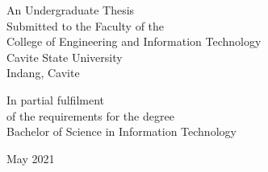 
\begin{singlespace}
	\begin{titlepage}
		\begin{center}
			\textbf{\thesistitle{}}

			\vfill
			\center
			An Undergraduate Thesis\\
			Submitted to the Faculty of the\\
			College of Engineering and Information Technology\\
			Cavite State University\\
			Indang, Cavite

			\vfill
			\center
			In partial fulfilment\\
			of the requirements for the degree\\
			Bachelor of Science in Information Technology

			\vfill
			\thesisautors{}
			{May 2021}

		\end{center}
	\end{titlepage}
\end{singlespace}
